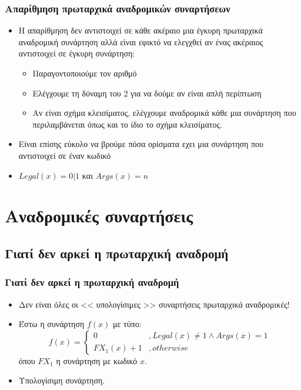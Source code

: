 \documentclass{beamer}
\begin{document}
\begin{frame}
        \frametitle{Απαρίθμηση πρωταρχικά αναδρομικών συναρτήσεων}
        \begin{itemize}
                \item Η απαρίθμηση δεν αντιστοιχεί σε κάθε ακέραιο μια έγκυρη
                πρωταρχικά αναδρομική συνάρτηση αλλά είναι εφικτό να ελεγχθεί αν
                ένας ακέραιος αντιστοιχεί σε έγκυρη συνάρτηση:
                \pause
                \begin{itemize}
                        \item Παραγοντοποιούμε τον αριθμό
                \pause
                        \item Ελέγχουμε τη δύναμη του 2 για να δούμε αν είναι απλή περίπτωση
                \pause
                        \item Αν είναι σχήμα κλεισίματος, ελέγχουμε αναδρομικά κάθε μια συνάρτηση
                        που περιλαμβάνεται όπως και το ίδιο το σχήμα κλεισίματος.
                \end{itemize}
                \pause
                \item Είναι επίσης εύκολο να βρούμε πόσα ορίσματα εχει μια συνάρτηση που αντιστοιχεί σε έναν κωδικό
                \pause
                \item \(Legal(x)=0|1\) και \(Args(x)=n\)
        \end{itemize}
\end{frame}

\section{Αναδρομικές συναρτήσεις}

\subsection{Γιατί δεν αρκεί η πρωταρχική αναδρομή}

\begin{frame}
        \frametitle{Γιατί δεν αρκεί η πρωταρχική αναδρομή}
        \begin{itemize}
                \item Δεν είναι όλες οι << υπολογίσιμες >> συναρτήσεις
                πρωταρχικά αναδρομικές!
                \pause
                \item Έστω η συνάρτηση \(f(x)\) με τύπο:
                \[f(x)=\left\{
                        \begin{array}{ll}
                                0 &, Legal(x) \neq 1 \wedge Args(x) = 1\\
                                FX_1(x) + 1 &, otherwise
                        \end{array}
                \right.\]
                όπου \(FX_1\) η συνάρτηση με κωδικό \(x\).
                \pause
                \item Υπολογίσιμη συνάρτηση.
        \end{itemize}
\end{frame}
\end{document}
